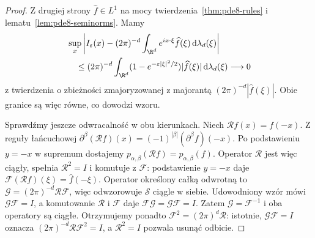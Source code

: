 \begin{proof}
Z drugiej strony $\widehat f\in L^1$ na mocy
twierdzenia~\ref{thm:pde8-rules} i
lematu~\ref{lem:pde8-seminorms}. Mamy
\[
 \begin{aligned}
 &\sup_x\left| I_\varepsilon(x)
 -(2\pi)^{-d}\int_{\R^d}e^{ix\cdot\xi}
 \widehat f(\xi)\,\mathrm d\lambda_d(\xi)\right|\\
 &\quad\le (2\pi)^{-d}\int_{\R^d}
 (1-e^{-\varepsilon|\xi|^2/2})|\widehat f(\xi)|
 \,\mathrm d\lambda_d(\xi)\longrightarrow0
 \end{aligned}
\]
z twierdzenia o zbieżności zmajoryzowanej
z majorantą $(2\pi)^{-d}|\widehat f(\xi)|$.
Obie granice są więc równe, co dowodzi wzoru.

Sprawdźmy jeszcze odwracalność w obu kierunkach.
Niech $\mathcal R f(x)=f(-x)$. Z reguły łańcuchowej
$\partial^\beta(\mathcal R f)(x)
=(-1)^{|\beta|}(\partial^\beta f)(-x)$.
Po podstawieniu $y=-x$ w supremum dostajemy
$p_{\alpha,\beta}(\mathcal R f)=p_{\alpha,\beta}(f)$.
Operator $\mathcal R$ jest więc ciągły,
spełnia $\mathcal R^2=I$
i komutuje z $\mathcal F$:
podstawienie $y=-x$ daje
$\mathcal F(\mathcal R f)(\xi)=\widehat f(-\xi)$.
Operator określony całką odwrotną to
$\mathcal G=(2\pi)^{-d}\mathcal R\mathcal F$,
więc odwzorowuje $\mathcal S$ ciągle w siebie.
Udowodniony wzór mówi $\mathcal G\mathcal F=I$,
a komutowanie $\mathcal R$ i $\mathcal F$ daje
$\mathcal F\mathcal G=\mathcal G\mathcal F=I$.
Zatem $\mathcal G=\mathcal F^{-1}$ i oba
operatory są ciągłe. Otrzymujemy ponadto
$\mathcal F^2=(2\pi)^d\mathcal R$:
istotnie, $\mathcal G\mathcal F=I$ oznacza
$(2\pi)^{-d}\mathcal R\mathcal F^2=I$,
a $\mathcal R^2=I$ pozwala usunąć odbicie.
\end{proof}


